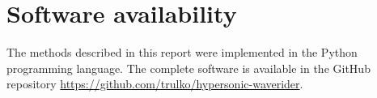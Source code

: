 \documentclass[10pt,a4paper]{article}
\begin{document}
\section{Software availability}
The methods described in this report were implemented in the Python programming language. The complete software is available in the GitHub repository {\small\url{https://github.com/trulko/hypersonic-waverider}}.


\FloatBarrier%
\printbibliography%
\end{document}
